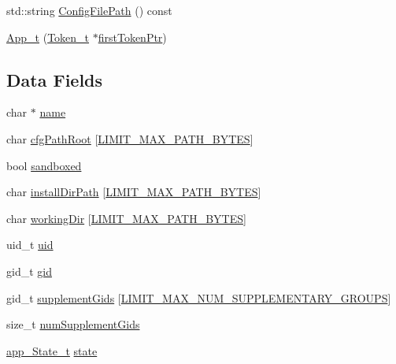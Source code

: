 \begin{DoxyCompactItemize}
\item 
std\+::string \hyperlink{struct_app__t_a90a4116ca5d9e34661444c2e94f9dba6}{Config\+File\+Path} () const 
\item 
\hyperlink{struct_app__t_aa5e9e26900a1695a5302566bf34fbcdc}{App\+\_\+t} (\hyperlink{struct_token__t}{Token\+\_\+t} $\ast$\hyperlink{struct_compound_item__t_a4d95dc788120f627e332491589d20c5c}{first\+Token\+Ptr})
\end{DoxyCompactItemize}
\subsection*{Data Fields}
\begin{DoxyCompactItemize}
\item 
char $\ast$ \hyperlink{struct_app__t_a689991ebd41e9ef9d7a467afef65e71b}{name}
\item 
char \hyperlink{struct_app__t_af940cbec1d49e8b8325bbf78d1af614f}{cfg\+Path\+Root} \mbox{[}\hyperlink{limit_8h_accd19a6264ef965c02f113dc01610e14}{L\+I\+M\+I\+T\+\_\+\+M\+A\+X\+\_\+\+P\+A\+T\+H\+\_\+\+B\+Y\+T\+ES}\mbox{]}
\item 
bool \hyperlink{struct_app__t_a56a1a7fd3515e4b30fa7d7ebe1e25528}{sandboxed}
\item 
char \hyperlink{struct_app__t_ad8e250fb083e7ecc502c5edd6fee73e7}{install\+Dir\+Path} \mbox{[}\hyperlink{limit_8h_accd19a6264ef965c02f113dc01610e14}{L\+I\+M\+I\+T\+\_\+\+M\+A\+X\+\_\+\+P\+A\+T\+H\+\_\+\+B\+Y\+T\+ES}\mbox{]}
\item 
char \hyperlink{struct_app__t_ab73578b0373eaa36fc6454a152bfbab0}{working\+Dir} \mbox{[}\hyperlink{limit_8h_accd19a6264ef965c02f113dc01610e14}{L\+I\+M\+I\+T\+\_\+\+M\+A\+X\+\_\+\+P\+A\+T\+H\+\_\+\+B\+Y\+T\+ES}\mbox{]}
\item 
uid\+\_\+t \hyperlink{struct_app__t_a916ba7e8111d3f5baa12506394046dbd}{uid}
\item 
gid\+\_\+t \hyperlink{struct_app__t_a2569f3015e70560e72a376bdd80c1f55}{gid}
\item 
gid\+\_\+t \hyperlink{struct_app__t_a32f5ecf9d792779a2ea70be0b418cb81}{supplement\+Gids} \mbox{[}\hyperlink{limit_8h_aa69d5ba387ba7f81b100829d4001dabc}{L\+I\+M\+I\+T\+\_\+\+M\+A\+X\+\_\+\+N\+U\+M\+\_\+\+S\+U\+P\+P\+L\+E\+M\+E\+N\+T\+A\+R\+Y\+\_\+\+G\+R\+O\+U\+PS}\mbox{]}
\item 
size\+\_\+t \hyperlink{struct_app__t_a0411c713746b9d2f79f84b163c018dcc}{num\+Supplement\+Gids}
\item 
\hyperlink{daemons_2linux_2supervisor_2app_8h_ab147e8213c5f5fddb0d0129aa8d98900}{app\+\_\+\+State\+\_\+t} \hyperlink{struct_app__t_a7c4d567f8dc13e91498fa3a5cd7a02d0}{state}

\end{DoxyCompactItemize}
